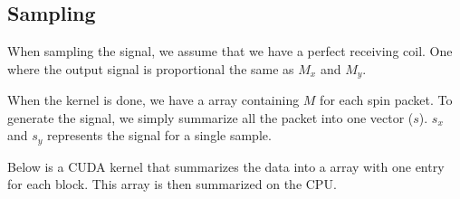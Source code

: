 






\subsection{Sampling}

When sampling the signal, we assume that we have a perfect receiving
coil. One where the output signal is proportional the same as $M_x$
and $M_y$.

When the kernel is done, we have a array containing $M$ for each spin
packet. To generate the signal, we simply summarize all the packet
into one vector ($s$). $s_x$ and $s_y$ represents the signal for a
single sample.

Below is a CUDA kernel that summarizes the data into a array with one
entry for each block. This array is then summarized on the CPU.

